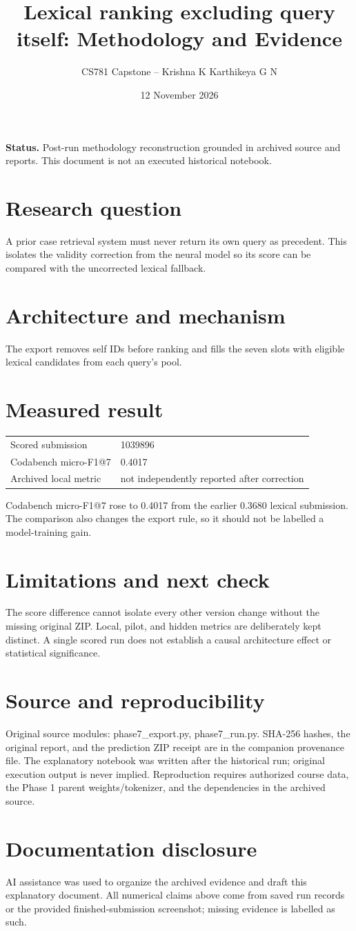 \documentclass[11pt,a4paper]{article}
\title{Lexical ranking excluding query itself: Methodology and Evidence}
\author{CS781 Capstone -- Krishna K Karthikeya G N}
\date{12 November 2026}
\begin{document}
\maketitle
\noindent\textbf{Status.} Post-run methodology reconstruction grounded in archived source and reports. This document is not an executed historical notebook.\par
\section*{Research question}
A prior case retrieval system must never return its own query as precedent. This isolates the validity correction from the neural model so its score can be compared with the uncorrected lexical fallback.
\section*{Architecture and mechanism}
The export removes self IDs before ranking and fills the seven slots with eligible lexical candidates from each query's pool.
\section*{Measured result}
\begin{center}\begin{tabular}{ll}Scored submission & 1039896\\
Codabench micro-F1@7 & 0.4017\\
Archived local metric & not independently reported after correction\end{tabular}\end{center}
Codabench micro-F1@7 rose to 0.4017 from the earlier 0.3680 lexical submission. The comparison also changes the export rule, so it should not be labelled a model-training gain.
\section*{Limitations and next check}
The score difference cannot isolate every other version change without the missing original ZIP. Local, pilot, and hidden metrics are deliberately kept distinct. A single scored run does not establish a causal architecture effect or statistical significance.
\section*{Source and reproducibility}
Original source modules: phase7\_export.py, phase7\_run.py. SHA-256 hashes, the original report, and the prediction ZIP receipt are in the companion provenance file. The explanatory notebook was written after the historical run; original execution output is never implied. Reproduction requires authorized course data, the Phase 1 parent weights/tokenizer, and the dependencies in the archived source.
\section*{Documentation disclosure}
AI assistance was used to organize the archived evidence and draft this explanatory document. All numerical claims above come from saved run records or the provided finished-submission screenshot; missing evidence is labelled as such.
\end{document}
